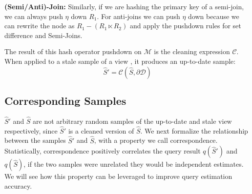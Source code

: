 
\vspace{.25em}

{\noindent \textbf{(Semi/Anti)-Join:}} Similarly, if we are hashing the primary key of a semi-join, we can always push $\eta$ down $R_1$. For anti-joins we can push $\eta$ down because we can rewrite the node as $R_1 - (R_1 \ltimes R_2) $ and apply the pushdown rules for set difference and Semi-Joins.

The result of this hash operator pushdown on $\mathcal{M}$ is the cleaning expression $\mathcal{C}$. 
When applied to a stale sample of a view , it produces an up-to-date sample:
\[
\widehat{S}' = \mathcal{C}(\widehat{S},\partial \mathcal{D})
\]

\subsection{Corresponding Samples}
$\widehat{S}'$ and $\widehat{S}$ are not arbitrary random samples of the up-to-date and stale view respectively, since $\widehat{S}'$ is a cleaned version of $\widehat{S}$.
We next formalize the relationship between the samples $\widehat{S}'$ and $\widehat{S}$, with a property we call correspondence.
Statistically, correspondence positively correlates the query result $q(\widehat{S}')$ and $q(\widehat{S})$, if the two samples were unrelated they would be independent estimates. 
We will see how this property can be leveraged to improve query estimation accuracy. 


